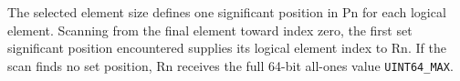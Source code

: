 The selected element size defines one significant position in Pn for each
logical element.  Scanning from the final element toward index zero, the first
set significant position encountered supplies its logical element index to Rn.
If the scan finds no set position, Rn receives the full 64-bit all-ones value
\texttt{UINT64\_MAX}.
